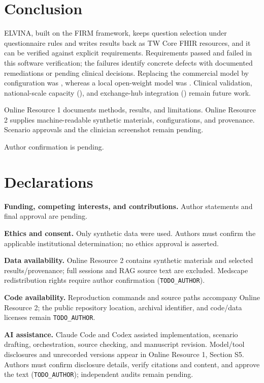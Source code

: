 \section{Conclusion}\label{sec:conclusion}
ELVINA, built on the FIRM framework, keeps question selection under
questionnaire rules and writes results back as TW Core FHIR resources, and it
can be verified against explicit requirements. Requirements \PassingRequirements{}
passed and \FailingRequirements{} failed in this software verification; the failures
identify concrete defects with documented remediations or pending clinical
decisions. Replacing the commercial model by configuration was
\EThreeAlternateSwapVerdict{}, whereas a local open-weight model was
\EThreeLocalSwapVerdict{}. Clinical validation, national-scale capacity
(\REightVerdict{}), and exchange-hub integration (\RNineVerdict{}) remain future work.

\backmatter
{}
Online Resource 1 documents methods, results, and limitations. Online Resource 2
supplies machine-readable synthetic materials, configurations, and provenance.
Scenario approvals and the clinician screenshot remain pending.

Author confirmation is pending.

\section*{Declarations}
\textbf{Funding, competing interests, and contributions.} Author statements and
final approval are pending.\par
\textbf{Ethics and consent.} Only synthetic data were used. Authors must confirm
the applicable institutional determination; no ethics approval is asserted.\par
\textbf{Data availability.} Online Resource 2 contains synthetic materials and
selected results/provenance; full sessions and RAG source text are excluded.
Medscape \citep{medscapeReference} redistribution rights require author confirmation
(\texttt{TODO\_AUTHOR}).\par
\textbf{Code availability.} Reproduction commands and source paths accompany
Online Resource 2; the public repository location, archival identifier, and code/data
licenses remain \texttt{TODO\_AUTHOR}.\par
\textbf{AI assistance.} Claude Code and Codex assisted implementation, scenario
drafting, orchestration, source checking, and manuscript revision. Model/tool
disclosures and unrecorded versions appear in Online Resource 1, Section S5.
Authors must confirm disclosure details, verify citations and content, and approve
the text (\texttt{TODO\_AUTHOR}); independent audits remain pending.


